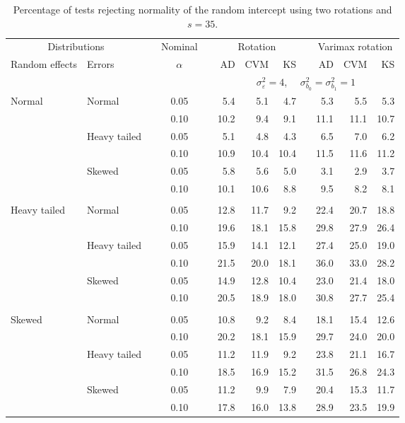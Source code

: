 \begin{table}[ht]
\centering
\caption{\label{tab:fixedsimb035} Percentage of tests rejecting normality of the random intercept using two rotations and $s = 35$.}
\begin{scriptsize}
\begin{tabular}{ll p{.1cm} c p{.1cm} rrr p{.1cm} rrr}
  \hline
  \multicolumn{2}{c}{Distributions}& & Nominal & &  \multicolumn{3}{c}{Rotation} & & \multicolumn{3}{c}{Varimax rotation} \\ \cline{1-2} \cline{6-8} \cline{10-12}   
  Random effects & Errors & & $\alpha$ & & AD & CVM & KS & & AD & CVM & KS \\ 
   \hline
& && && \multicolumn{7}{c}{$\sigma_{\varepsilon}^2 = 4$, \ \ $\sigma_{b_0}^2 = \sigma_{b_1}^2 = 1$} \\ \cline{6-12}
\rowcolor{gray!20} Normal & Normal &  & 0.05 &  & 5.4 & 5.1 & 4.7 &  & 5.3 & 5.5 & 5.3 \\ 
\rowcolor{gray!20}    &  &  & 0.10 &  & 10.2 & 9.4 & 9.1 &  & 11.1 & 11.1 & 10.7 \\ 
\rowcolor{gray!20}    & Heavy tailed &  & 0.05 &  & 5.1 & 4.8 & 4.3 &  & 6.5 & 7.0 & 6.2 \\ 
\rowcolor{gray!20}    &  &  & 0.10 &  & 10.9 & 10.4 & 10.4 &  & 11.5 & 11.6 & 11.2 \\ 
\rowcolor{gray!20}    & Skewed &  & 0.05 &  & 5.8 & 5.6 & 5.0 &  & 3.1 & 2.9 & 3.7 \\ 
\rowcolor{gray!20}    &  &  & 0.10 &  & 10.1 & 10.6 & 8.8 &  & 9.5 & 8.2 & 8.1 \\ 
&&&&&&&&&&&\\
  Heavy tailed & Normal &  & 0.05 &  & 12.8 & 11.7 & 9.2 &  & 22.4 & 20.7 & 18.8 \\ 
   &  &  & 0.10 &  & 19.6 & 18.1 & 15.8 &  & 29.8 & 27.9 & 26.4 \\ 
   & Heavy tailed &  & 0.05 &  & 15.9 & 14.1 & 12.1 &  & 27.4 & 25.0 & 19.0 \\ 
   &  &  & 0.10 &  & 21.5 & 20.0 & 18.1 &  & 36.0 & 33.0 & 28.2 \\ 
   & Skewed &  & 0.05 &  & 14.9 & 12.8 & 10.4 &  & 23.0 & 21.4 & 18.0 \\ 
   &  &  & 0.10 &  & 20.5 & 18.9 & 18.0 &  & 30.8 & 27.7 & 25.4 \\ 
&&&&&&&&&&&\\
  Skewed & Normal &  & 0.05 &  & 10.8 & 9.2 & 8.4 &  & 18.1 & 15.4 & 12.6 \\ 
   &  &  & 0.10 &  & 20.2 & 18.1 & 15.9 &  & 29.7 & 24.0 & 20.0 \\ 
   & Heavy tailed &  & 0.05 &  & 11.2 & 11.9 & 9.2 &  & 23.8 & 21.1 & 16.7 \\ 
   &  &  & 0.10 &  & 18.5 & 16.9 & 15.2 &  & 31.5 & 26.8 & 24.3 \\ 
   & Skewed &  & 0.05 &  & 11.2 & 9.9 & 7.9 &  & 20.4 & 15.3 & 11.7 \\ 
   &  &  & 0.10 &  & 17.8 & 16.0 & 13.8 &  & 28.9 & 23.5 & 19.9 \\ 


\end{tabular}
\end{scriptsize}
\end{table}

